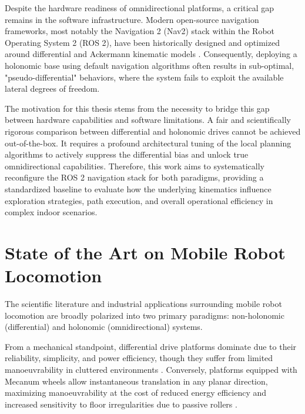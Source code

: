 Despite the hardware readiness of omnidirectional platforms, a critical gap remains in the software infrastructure. Modern open-source navigation frameworks, most notably the Navigation 2 (Nav2) stack within the Robot Operating System 2 (ROS 2), have been historically designed and optimized around differential and Ackermann kinematic models \cite{macenski_marathon_2020}. Consequently, deploying a holonomic base using default navigation algorithms often results in sub-optimal, "pseudo-differential" behaviors, where the system fails to exploit the available lateral degrees of freedom. 

The motivation for this thesis stems from the necessity to bridge this gap between hardware capabilities and software limitations. A fair and scientifically rigorous comparison between differential and holonomic drives cannot be achieved out-of-the-box. It requires a profound architectural tuning of the local planning algorithms to actively suppress the differential bias and unlock true omnidirectional capabilities. Therefore, this work aims to systematically reconfigure the ROS 2 navigation stack for both paradigms, providing a standardized baseline to evaluate how the underlying kinematics influence exploration strategies, path execution, and overall operational efficiency in complex indoor scenarios.

\section{State of the Art on Mobile Robot Locomotion}

The scientific literature and industrial applications surrounding mobile robot locomotion are broadly polarized into two primary paradigms: non-holonomic (differential) and holonomic (omnidirectional) systems.

From a mechanical standpoint, differential drive platforms dominate due to their reliability, simplicity, and power efficiency, though they suffer from limited manoeuvrability in cluttered environments \cite{pal_blog_omni_diff}. Conversely, platforms equipped with Mecanum wheels allow instantaneous translation in any planar direction, maximizing manoeuvrability at the cost of reduced energy efficiency and increased sensitivity to floor irregularities due to passive rollers \cite{taheri_kinematic_2015, reque_mechatronics_2021, yepez-figueroa_design_2025}.

